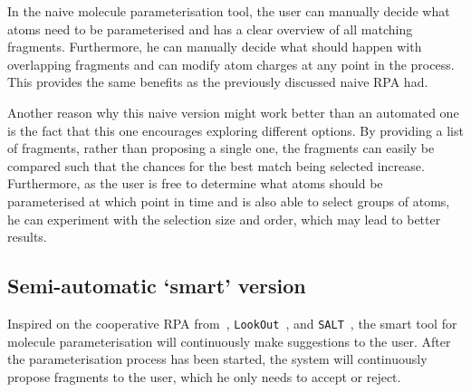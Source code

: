 In the naive molecule parameterisation tool, the user can manually decide what atoms need to be parameterised and has a clear overview of all matching fragments. Furthermore, he can manually decide what should happen with overlapping fragments and can modify atom charges at any point in the process. This provides the same benefits as the previously discussed naive RPA had.

Another reason why this naive version might work better than an automated one is the fact that this one encourages exploring different options. By providing a list of fragments, rather than proposing a single one, the fragments can easily be compared such that the chances for the best match being selected increase. Furthermore, as the user is free to determine what atoms should be parameterised at which point in time and is also able to select groups of atoms, he can experiment with the selection size and order, which may lead to better results.


\subsection{Semi-automatic `smart' version}
Inspired on the cooperative RPA from~\cite{payne2000varying}, \verb|LookOut|~\cite{horvitz1999principles}, and \verb|SALT|~\cite{marcus1987taking}, the smart tool for molecule parameterisation will continuously make suggestions to the user. After the parameterisation process has been started, the system will continuously propose fragments to the user, which he only needs to accept or reject.

